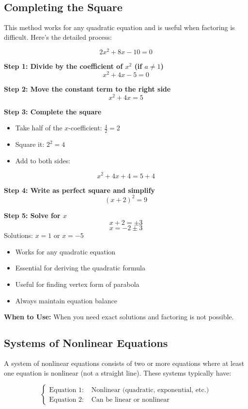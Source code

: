 \documentclass{article} %
\begin{document}
\subsection{Completing the Square}

This method works for any quadratic equation and is useful when factoring is difficult. Here's the detailed process:

\[ 2x^2 + 8x - 10 = 0 \]

\textbf{Step 1: Divide by the coefficient of $x^2$ (if $a \neq 1$)}
\[ x^2 + 4x - 5 = 0 \]

\textbf{Step 2: Move the constant term to the right side}
\[ x^2 + 4x = 5 \]

\textbf{Step 3: Complete the square}
\begin{itemize}
    \item Take half of the $x$-coefficient: $\frac{4}{2} = 2$
    \item Square it: $2^2 = 4$
    \item Add to both sides: 
\end{itemize}
\[ x^2 + 4x + 4 = 5 + 4 \]

\textbf{Step 4: Write as perfect square and simplify}
\[ (x + 2)^2 = 9 \]

\textbf{Step 5: Solve for $x$}
\[ x + 2 = \pm 3 \]
\[ x = -2 \pm 3 \]
Solutions: $x = 1$ or $x = -5$

\begin{itemize}
    \item Works for any quadratic equation
    \item Essential for deriving the quadratic formula
    \item Useful for finding vertex form of parabola
    \item Always maintain equation balance
\end{itemize}

\textbf{When to Use:} When you need exact solutions and factoring is not possible.

\subsection{Systems of Nonlinear Equations}

A system of nonlinear equations consists of two or more equations where at least one equation is nonlinear (not a straight line). These systems typically have:

\[
\begin{cases}
\text{Equation 1: } & \text{Nonlinear (quadratic, exponential, etc.)} \\
\text{Equation 2: } & \text{Can be linear or nonlinear}
\end{cases}
\]
\end{document}
